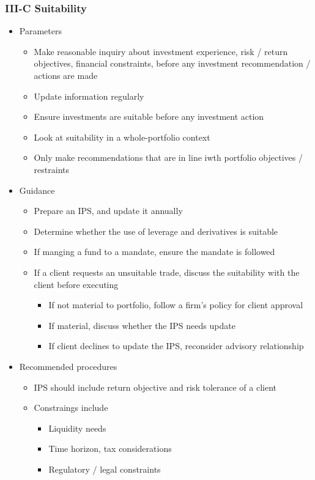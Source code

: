 \documentclass[../notes_compiled.tex]{subfiles}
\begin{document}
\subsubsection{III-C Suitability}
\begin{itemize}
\item Parameters
\begin{itemize}
\item Make reasonable inquiry about investment experience, risk / return objectives, financial constraints, before any investment recommendation / actions are made
\item Update information regularly
\item Ensure investments are suitable before any investment action
\item Look at suitability in a whole-portfolio context
\item Only make recommendations that are in line iwth portfolio objectives / restraints
\end{itemize}
\item Guidance
\begin{itemize}
\item Prepare an IPS, and update it annually
\item Determine whether the use of leverage and derivatives is suitable
\item If manging a fund to a mandate, ensure the mandate is followed
\item If a client requests an unsuitable trade, discuss the suitability with the client before executing
\begin{itemize}
\item If not material to portfolio, follow a firm’s policy for client approval
\item If material, discuss whether the IPS needs update
\item If client declines to update the IPS, reconsider advisory relationship
\end{itemize}
\end{itemize}
\item Recommended procedures
\begin{itemize}
\item IPS should include return objective and risk tolerance of a client
\item Constraings include
\begin{itemize}
\item Liquidity needs
\item Time horizon, tax considerations
\item Regulatory / legal constraints
\end{itemize}
\end{itemize}
\end{itemize}
\end{document}
